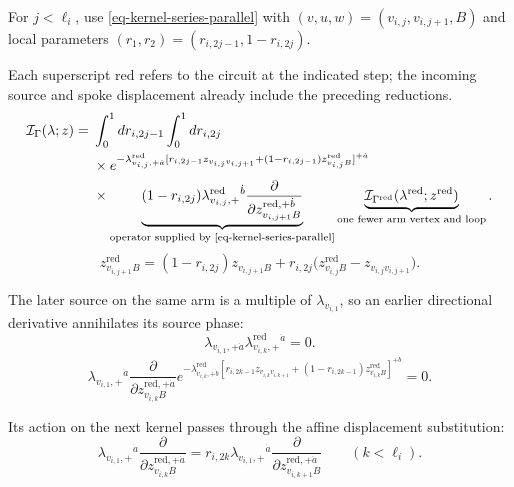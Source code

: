 \documentclass[11pt]{article}
\numberwithin{equation}{section}
\numberwithin{figure}{section}
\numberwithin{table}{section}
\begin{document}
For $j<\ell_i$, use \eqref{eq-kernel-series-parallel} with $(v,u,w)=(v_{i,j},v_{i,j+1},B)$ and local parameters $(r_1,r_2)=(r_{i,2j-1},1-r_{i,2j})$.

Each superscript $\mathrm{red}$ refers to the circuit at the indicated step; the incoming source and spoke displacement already include the preceding reductions.
\begin{equation*}
\begin{aligned}
\mathcal I_\Gamma(\lambda;z)
={}&\int_0^1dr_{i,2j-1}\int_0^1dr_{i,2j}\\
&\times e^{-\lambda^{\mathrm{red}}_{v_{i,j},+\dot a}
[r_{i,2j-1}z_{v_{i,j}v_{i,j+1}}+(1-r_{i,2j-1})z_{v_{i,j}B}^{\mathrm{red}}]^{+\dot a}}\\
&\times\underbrace{(1-r_{i,2j})\lambda^{\mathrm{red}}_{v_{i,j},+}{}^{\dot b}
\frac{\partial}{\partial z_{v_{i,j+1}B}^{\mathrm{red},+\dot b}}}_{\text{operator supplied by \eqref{eq-kernel-series-parallel}}}
\underbrace{\mathcal I_{\Gamma^{\mathrm{red}}}
(\lambda^{\mathrm{red}};z^{\mathrm{red}})}_{\text{one fewer arm vertex and loop}}.
\end{aligned}
\end{equation*}
\begin{equation*}
z_{v_{i,j+1}B}^{\mathrm{red}}
=(1-r_{i,2j})z_{v_{i,j+1}B}
+r_{i,2j}\bigl(z_{v_{i,j}B}^{\mathrm{red}}-z_{v_{i,j}v_{i,j+1}}\bigr).
\end{equation*}

The later source on the same arm is a multiple of $\lambda_{v_{i,1}}$, so an earlier directional derivative annihilates its source phase:
\begin{equation*}
\lambda_{v_{i,1},+\dot a}\lambda_{v_{i,k},+}^{\mathrm{red}}{}^{\dot a}=0.
\end{equation*}
\begin{equation*}
\lambda_{v_{i,1},+}{}^{\dot a}
    \frac{\partial}{\partial z_{v_{i,k}B}^{\mathrm{red},+\dot a}}
     e^{-\lambda_{v_{i,k},+\dot b}^{\mathrm{red}}
    [r_{i,2k-1}z_{v_{i,k}v_{i,k+1}}+(1-r_{i,2k-1})z_{v_{i,k}B}^{\mathrm{red}}]^{+\dot b}}=0.
\end{equation*}

Its action on the next kernel passes through the affine displacement substitution:
\begin{equation*}
\lambda_{v_{i,1},+}{}^{\dot a}
\frac{\partial}{\partial z_{v_{i,k}B}^{\mathrm{red},+\dot a}}
=r_{i,2k}\lambda_{v_{i,1},+}{}^{\dot a}
\frac{\partial}{\partial z_{v_{i,k+1}B}^{\mathrm{red},+\dot a}}
\qquad(k<\ell_i).
\end{equation*}
\end{document}
